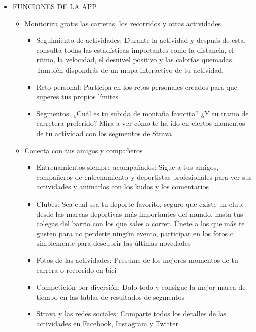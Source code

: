 \documentclass[a4paper, 11pt]{article}
\begin{document}
                    \begin{itemize}
                      \item{FUNCIONES DE LA APP}
                      \begin{itemize}
                        \item {Monitoriza gratis las carreras, los recorridos y otras actividades}
                        \begin{itemize}
                          \item {Seguimiento de actividades: Durante la actividad y después de esta, consulta todas las estadísticas importantes como la distancia, el ritmo, la velocidad, el desnivel positivo y las calorías quemadas. También dispondrás de un mapa interactivo de tu actividad.}
                          \item {Reto personal: Participa en los retos personales creados para que superes tus propios límites}
                          \item {Segmentos: ¿Cuál es tu subida de montaña favorita? ¿Y tu tramo de carretera preferido? Mira a ver cómo te ha ido en ciertos momentos de tu actividad con los segmentos de Strava}
                        \end{itemize}
                        \item {Conecta con tus amigos y compañeros}
                        \begin{itemize}
                          \item {Entrenamientos siempre acompañados: Sigue a tus amigos, compañeros de entrenamiento y deportistas profesionales para ver sus actividades y animarlos con los kudos y los comentarios}
                          \item {Clubes: Sea cual sea tu deporte favorito, seguro que existe un club; desde las marcas deportivas más importantes del mundo, hasta tus colegas del barrio con los que sales a correr. Únete a los que más te gusten para no perderte ningún evento, participar en los foros o simplemente para descubrir las últimas novedades}
                          \item {Fotos de las actividades: Presume de los mejores momentos de tu carrera o recorrido en bici}
                          \item {Competición por diversión: Dalo todo y consigue la mejor marca de tiempo en las tablas de resultados de segmentos}
                          \item {Strava y las redes sociales: Comparte todos los detalles de las actividades en Facebook, Instagram y Twitter}

\end{itemize}
\end{itemize}
\end{itemize}
\end{document}
